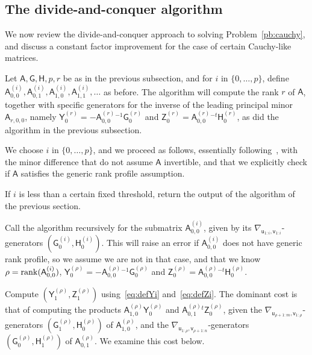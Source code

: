 \documentclass{sig-alternate}
\newcommand{\vu}{\ensuremath{\mathsf{u}}}
\newcommand{\vv}{\ensuremath{\mathsf{v}}}
\newcommand{\mA}{\ensuremath{\mathsf{A}}}
\newcommand{\mG}{\ensuremath{\mathsf{G}}}
\newcommand{\mH}{\ensuremath{\mathsf{H}}}
\newcommand{\mY}{\ensuremath{\mathsf{Y}}}
\newcommand{\mZ}{\ensuremath{\mathsf{Z}}}
\begin{document}

\subsection{The divide-and-conquer algorithm}\label{ssec:MBA-C}

We now review the divide-and-conquer approach to solving
Problem~\ref{pb:cauchy}, and discuss a constant factor improvement for
the case of certain Cauchy-like matrices. 

Let $\mA,\mG,\mH,p,r$ be as in the previous subsection, and for $i$ in
$\{0,\dots,p\}$, define
${\mA^{(i)}_{0,0}},\mA^{(i)}_{0,1},\mA^{(i)}_{1,0},\mA^{(i)}_{1,1},\dots$ as before.
The algorithm will compute the rank $r$ of $\mA$, together with
specific generators for the inverse of the leading principal minor
$\mA_{r,0,0}$, namely $\mY^{(r)}_0=-\mA^{(r)}_{0,0}{}^{-1} \mG^{(r)}_0$ and
  $\mZ^{(r)}_0=\mA^{(r)}_{0,0}{}^{-t}\mH^{(r)}_0$, as did the algorithm in the
  previous subsection.

We choose $i$ in $\{0,\dots,p\}$, and we proceed as follows,
essentially following~\cite{JeMo10}, with the minor difference that do
not assume $\mA$ invertible, and that we explicitly check if $\mA$
satisfies the generic rank profile assumption.

\smallskip{} If $i$ is less than a certain fixed threshold, return the
output of the algorithm of the previous section.

\smallskip{} Call the algorithm recursively for the
submatrix ${\mA^{(i)}_{0,0}}$, given by its
$\nabla_{\vu_{1:i},\vv_{1:i}}$-generators
$(\mG^{(i)}_0,\mH^{(i)}_0)$. This will raise an error if
${\mA^{(i)}_{0,0}}$ does not have generic rank profile, so we assume
we are not in that case, and that we know $\rho={\rm
  rank}({\mA^{(i)}_{0,0}})$, $\mY^{(\rho)}_0=-\mA^{(\rho)}_{0,0}{}^{-1}
\mG^{(\rho)}_0$ and $\mZ^{(\rho)}_0=\mA^{(\rho)}_{0,0}{}^{-t}\mH^{(\rho)}_0$.

\smallskip{} Compute $(\mY^{(\rho)}_1,\mZ^{(\rho)}_1)$
using~\eqref{eq:defYi} and~\eqref{eq:defZi}. The dominant cost is that
of computing the products $\mA^{(\rho)}_{1,0} \mY^{(\rho)}_0$ and
$\mA^{(\rho)}_{0,1}{}^t \mZ^{(\rho)}_0$, given the
$\nabla_{\vu_{\rho+1:m},\vv_{1:\rho}}$-generators
$(\mG^{(\rho)}_1,\mH^{(\rho)}_0)$ of $\mA^{(\rho)}_{1,0}$, and the
$\nabla_{\vu_{1:\rho},\vv_{\rho+1:n}}$-generators
$(\mG^{(\rho)}_0,\mH^{(\rho)}_1)$ of $\mA^{(\rho)}_{0,1}$.  We examine this cost
below.
\end{document}
